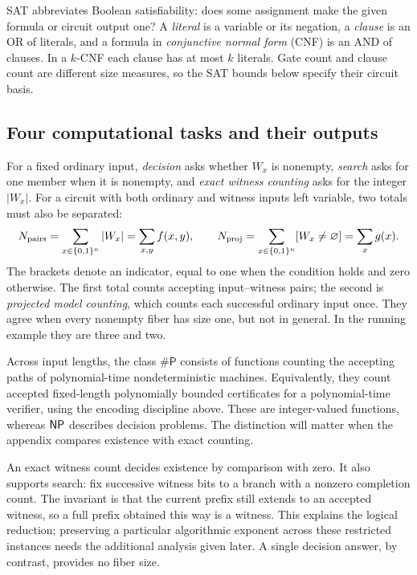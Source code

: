 SAT abbreviates Boolean satisfiability: does some assignment make the
given formula or circuit output one? A \emph{literal} is a variable or its
negation, a \emph{clause} is an OR of literals, and a formula in
\emph{conjunctive normal form} (CNF) is an AND of clauses. In a $k$-CNF
each clause has at most $k$ literals. Gate count and clause count are
different size measures, so the SAT bounds below specify their circuit basis.

\subsection{Four computational tasks and their outputs}

For a fixed ordinary input, \emph{decision} asks whether $W_x$ is nonempty,
\emph{search} asks for one member when it is nonempty, and \emph{exact
witness counting} asks for the integer $|W_x|$. For a circuit with both
ordinary and witness inputs left variable, two totals must also be separated:
\begin{equation}\label{eq:foundations-counts}
 N_{\mathrm{pairs}}=\sum_{x\in\{0,1\}^n}|W_x|
                  =\sum_{x,y}f(x,y),\qquad
 N_{\mathrm{proj}}=\sum_{x\in\{0,1\}^n}[W_x\ne\varnothing]
                 =\sum_x g(x).
\end{equation}
The brackets denote an indicator, equal to one when the condition holds
and zero otherwise. The first total counts accepting input--witness pairs;
the second is \emph{projected model counting}, which counts each successful
ordinary input once. They agree when every nonempty fiber has size one,
but not in general. In the running example they are three and two.

Across input lengths, the class $\#\mathsf P$ consists of functions counting
the accepting paths of polynomial-time nondeterministic machines.
Equivalently, they count accepted fixed-length polynomially bounded
certificates for a polynomial-time verifier, using the encoding discipline
above. These are integer-valued functions, whereas $\mathsf{NP}$ describes decision
problems. The distinction will matter when the appendix compares existence
with exact counting.

An exact witness count decides existence by comparison with zero. It also
supports search: fix successive witness bits to a branch with a nonzero
completion count. The invariant is that the current prefix still extends
to an accepted witness, so a full prefix obtained this way is a witness.
This explains the logical reduction; preserving a particular algorithmic
exponent across these restricted instances needs the additional analysis
given later. A single decision answer, by contrast, provides no fiber size.

